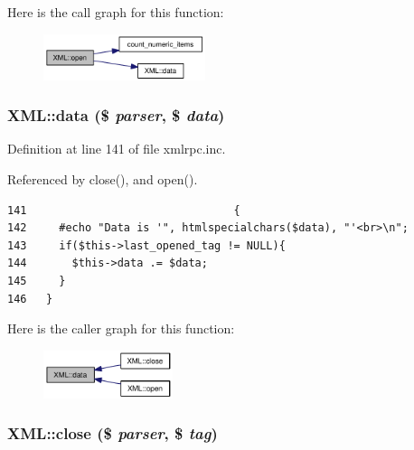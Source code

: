 Here is the call graph for this function:\nopagebreak
\begin{figure}[H]
\begin{center}
\leavevmode
\includegraphics[width=134pt]{classXML_eac7eae74d866d4f5a0cdb9be27ff279_cgraph}
\end{center}
\end{figure}
\hypertarget{classXML_ca70dfbd3e8ce956075181701b09b033}{
\subsubsection{\setlength{\rightskip}{0pt plus 5cm}XML::data (\$ {\em parser}, \$ {\em data})}}
\label{classXML_ca70dfbd3e8ce956075181701b09b033}




Definition at line 141 of file xmlrpc.inc.

Referenced by close(), and open().

\begin{Code}\begin{verbatim}141                                {
142     #echo "Data is '", htmlspecialchars($data), "'<br>\n";
143     if($this->last_opened_tag != NULL){
144       $this->data .= $data;
145     }
146   }
\end{verbatim}
\end{Code}




Here is the caller graph for this function:\nopagebreak
\begin{figure}[H]
\begin{center}
\leavevmode
\includegraphics[width=107pt]{classXML_ca70dfbd3e8ce956075181701b09b033_icgraph}
\end{center}
\end{figure}
\hypertarget{classXML_60144a2134fc1b7f5b4b1b6a7c56bf04}{
\subsubsection{\setlength{\rightskip}{0pt plus 5cm}XML::close (\$ {\em parser}, \$ {\em tag})}}
\label{classXML_60144a2134fc1b7f5b4b1b6a7c56bf04}




